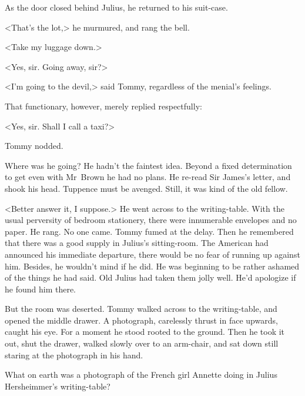 As the door closed behind Julius, he returned to his suit-case.

<That's the lot,> he murmured, and rang the bell.

<Take my luggage down.>

<Yes, sir. Going away, sir?>

<I'm going to the devil,> said Tommy, regardless of the menial's feelings.

That functionary, however, merely replied respectfully:

<Yes, sir. Shall I call a taxi?>

Tommy nodded.

Where was he going? He hadn't the faintest idea. Beyond a fixed determination to get even with Mr~Brown he had no plans. He re-read Sir James's letter, and shook his head. Tuppence must be avenged. Still, it was kind of the old fellow.

<Better answer it, I suppose.> He went across to the writing-table. With the usual perversity of bedroom stationery, there were innumerable envelopes and no paper. He rang. No one came. Tommy fumed at the delay. Then he remembered that there was a good supply in Julius's sitting-room. The American had announced his immediate departure, there would be no fear of running up against him. Besides, he wouldn't mind if he did. He was beginning to be rather ashamed of the things he had said. Old Julius had taken them jolly well. He'd apologize if he found him there.

But the room was deserted. Tommy walked across to the writing-table, and opened the middle drawer. A photograph, carelessly thrust in face upwards, caught his eye. For a moment he stood rooted to the ground. Then he took it out, shut the drawer, walked slowly over to an arm-chair, and sat down still staring at the photograph in his hand.

What on earth was a photograph of the French girl Annette doing in Julius Hersheimmer's writing-table? 